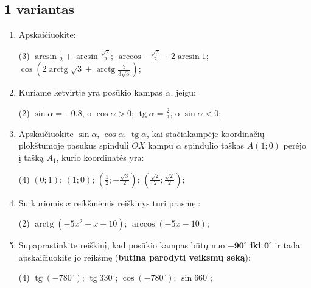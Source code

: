 \documentclass[a4paper]{article}
\DeclareMathOperator{\tg}{tg}
\DeclareMathOperator{\arctg}{arctg}
\begin{document}
\subsection*{1 variantas}

\begin{enumerate}
      \item Apskaičiuokite:

            \begin{tasks}[item-format={\normalfont}, after-item-skip=4mm](3)
                  \task $\arcsin{\frac{1}{2}} + \arcsin{\frac{\sqrt{2}}{2}} $;
                  \task $\arccos{-\frac{\sqrt{3}}{2}} + 2\arcsin{1} $;
                  \task $\cos({2\arctg{\sqrt{3}} +
                              \arctg{\frac{3}{3\sqrt{3}}}})  $;

            \end{tasks}

      \item Kuriame ketvirtje yra posūkio kampas $\alpha$, jeigu:
            \begin{tasks}[item-format={\normalfont}, after-item-skip=4mm](2)
                  \task $\sin \alpha = -0.8$, o $\cos \alpha > 0$;
                  \task $\tg \alpha = \frac{2}{3}$, o $\sin \alpha < 0$;
            \end{tasks}
      \item Apskaičiuokite $\sin \alpha$, $\cos \alpha$, $\tg \alpha$, kai
            stačiakampėje koordinačių plokštumoje pasukus spindulį $OX$ kampu
            $\alpha$ spindulio taškas $A(1; 0)$ perėjo į tašką $A_{1}$, kurio
            koordinatės
            yra:
            \begin{tasks}[item-format={\normalfont}, after-item-skip=4mm](4)
                  \task $(0; 1)$;
                  \task $(1; 0)$;
                  \task $(\frac{1}{2}; -\frac{\sqrt{3}}{2})$;
                  \task $(\frac{\sqrt{2}}{2}; \frac{\sqrt{2}}{2})$;
            \end{tasks}

      \item Su kuriomis $x$ reikšmėmis reiškinys turi prasmę::
            \begin{tasks}[item-format={\normalfont},
                        after-item-skip=4mm](2)
                  \task $\arctg(-5x^2+x+10)$;
                  \task $\arccos(-5x-10)$;
            \end{tasks}
      \item Supaprastinkite reiškinį, kad posūkio kampas būtų nuo
            \textbf{$\boldsymbol{-90^\circ}$
                  iki  $\boldsymbol{0^\circ}$} ir tada apskaičiuokite jo
            reikšmę
            (\textbf{būtina parodyti veiksmų seką}):
            \begin{tasks}[item-format={\normalfont},
                        after-item-skip=4mm](4)
                  \task $\tg (-780^\circ)$;
                  \task $\tg 330^\circ$;
                  \task $\cos (-780^\circ)$;
                  \task $\sin 660^\circ$;
            \end{tasks}


\end{enumerate}
\end{document}
